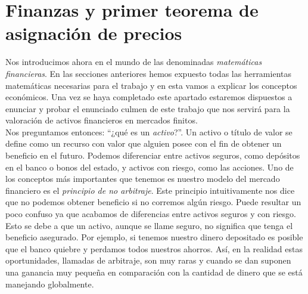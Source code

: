 \chapter{Finanzas y primer teorema de asignación de precios}

Nos introducimos ahora en el mundo de las denominadas \textit{matemáticas financieras}. En las secciones anteriores hemos expuesto todas las herramientas matemáticas necesarias para el trabajo y en esta vamos a explicar los conceptos económicos. Una vez se haya completado este apartado estaremos dispuestos a enunciar y probar el enunciado culmen de este trabajo que nos servirá para la valoración de activos financieros en mercados finitos. \\

Nos preguntamos entonces: ``¿qué es un \textit{activo}?''. Un activo o título de valor se define como un recurso con valor que alguien posee con el fin de obtener un beneficio en el futuro. Podemos diferenciar entre activos seguros, como depósitos en el banco o bonos del estado, y activos con riesgo, como las acciones. Uno de los conceptos más importantes que tenemos es nuestro modelo del mercado financiero es el \textit{principio de no arbitraje}. Este principio intuitivamente nos dice que no podemos obtener beneficio si no corremos algún riesgo. Puede resultar un poco confuso ya que acabamos de diferencias entre activos seguros y con riesgo. Esto se debe a que un activo, aunque se llame seguro, no significa que tenga el  beneficio asegurado. Por ejemplo, si tenemos nuestro dinero depositado es posible que el banco quiebre y perdamos todos nuestros ahorros. Así, en la realidad estas oportunidades, llamadas de arbitraje, son muy raras y cuando se dan suponen una ganancia muy pequeña en comparación con la cantidad de dinero que se está manejando globalmente.\\

